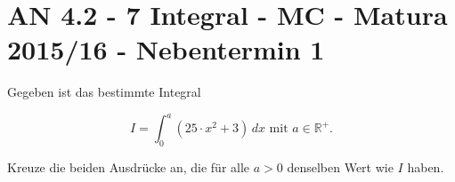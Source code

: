 \section{AN 4.2 - 7 Integral - MC - Matura 2015/16 - Nebentermin 1}

\begin{beispiel}[AN 4.2]{1} %
Gegeben ist das bestimmte Integral

$$I=\int_{0}^{a}(25\cdot x^2+3)\,dx \text{ mit }a\in \mathbb{R}^+.$$

Kreuze die beiden Ausdrücke an, die für alle $a>0$ denselben Wert wie $I$ haben.

\end{beispiel}